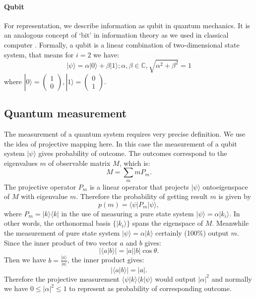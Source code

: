 \documentclass[12pt]{article}
\begin{document}
\paragraph{Qubit}

For representation, we describe information as qubit in quantum mechanics. It is an analogous concept of ‘bit’ in information theory as we used in classical computer \cite[p.13]{nielsen2000quantum}. Formally, a qubit is a linear combination of two-dimensional state system, that means for $i=2$ we have:
\[
	|\psi \rangle =\alpha |0\rangle + \beta|1\rangle; \alpha, \beta \in \mathbb{C}, \sqrt{\alpha^2+\beta^2}=1
\]
where $|0\rangle=\begin{pmatrix}
1\\0
\end{pmatrix}, |1\rangle=
\begin{pmatrix}
0\\1
\end{pmatrix}.$
\subsection{Quantum measurement}\label{Quantum measurement}
The measurement of a quantum system requires very precise definition. We use the idea of projective mapping here. In this case the measurement of a qubit system $|\psi\rangle$ gives probability of outcome. The outcomes correspond to the eigenvalues $m$ of observable matrix $M$, which is:
\[
	M=\sum_m mP_m.
\]
The projective operator $P_m$ is a linear operator that projects $|\psi\rangle$ onto\linebreak eigenspace of $M$ with eigenvalue $m$. Therefore the probability of getting result $m$ is given by \[
	p(m)=\langle \psi|P_m|\psi\rangle,
\]
where $P_m=|k\rangle\langle k|$ in the use of measuring a pure state system $|\psi \rangle =\alpha|k_i\rangle$. In other words, the orthonormal basis $\{|k_i\rangle\}$ spans the eigenspace of $M$. Meanwhile the measurement of pure state system $|\psi \rangle =\alpha|k\rangle$ certainly (100\%) output $m$. Since the inner product of two vector $a$ and $b$ gives:
\[
	|\langle a|b\rangle|=|a||b|\cos\theta.
\]
Then we have $b=\frac{|a\rangle}{|a|}$, the inner product gives:
\[
	|\langle a|b\rangle|=|a|.
\]
Therefore the projective measurement $\langle\psi|k\rangle \langle k|\psi\rangle$ would output $|\alpha|^2$ and normally we have $0\leq|\alpha|^2\leq1$ to represent as probability of corresponding outcome. 
\end{document}
